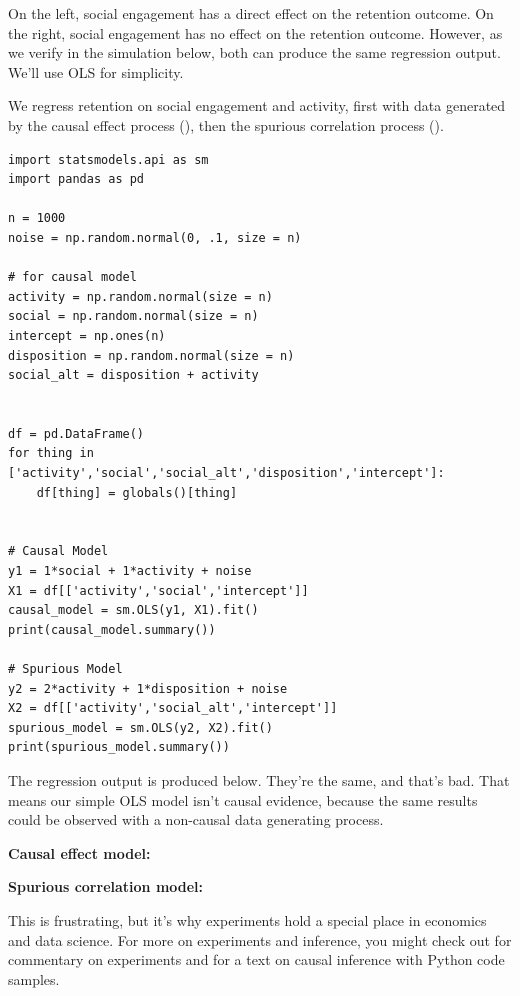 On the left, social engagement has a direct effect on the retention outcome. On the right, social engagement has no effect on the retention outcome. However, as we verify in the simulation below, both can produce the same regression output. We'll use OLS for simplicity.  

We regress retention on social engagement and activity, first with data generated by the causal effect process (), then the spurious correlation process ().

\begin{lstlisting}
import statsmodels.api as sm
import pandas as pd

n = 1000
noise = np.random.normal(0, .1, size = n)

# for causal model
activity = np.random.normal(size = n)
social = np.random.normal(size = n)
intercept = np.ones(n)
disposition = np.random.normal(size = n)
social_alt = disposition + activity
    

df = pd.DataFrame()
for thing in ['activity','social','social_alt','disposition','intercept']:
    df[thing] = globals()[thing]


# Causal Model
y1 = 1*social + 1*activity + noise
X1 = df[['activity','social','intercept']]
causal_model = sm.OLS(y1, X1).fit()
print(causal_model.summary())

# Spurious Model
y2 = 2*activity + 1*disposition + noise
X2 = df[['activity','social_alt','intercept']]
spurious_model = sm.OLS(y2, X2).fit()
print(spurious_model.summary())
\end{lstlisting}

The regression output is produced below. They're the same, and that's bad. That means our simple OLS model isn't causal evidence, because the same results could be observed with a non-causal data generating process. 

\textbf{Causal effect model:}
\begin{footnotesize}

\end{footnotesize}

\textbf{Spurious correlation model:}
\begin{footnotesize}

\end{footnotesize}

This is frustrating, but it's why experiments hold a special place in economics and data science. For more on experiments and inference, you might check out \cite{luca2020want} for commentary on experiments and \cite{cunningham2021causal} for a text on causal inference with Python code samples. 

